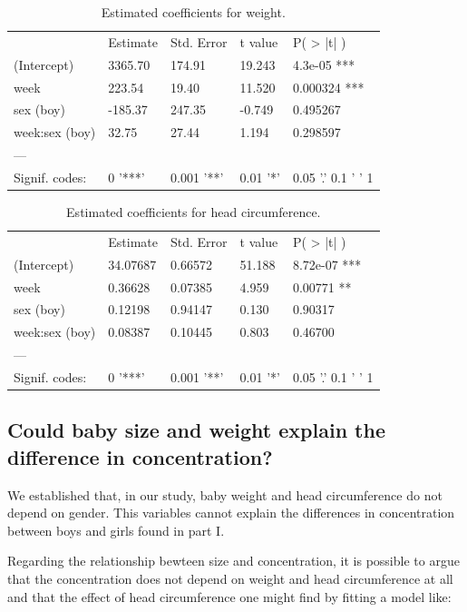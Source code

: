 \documentclass[12pt]{article}
\begin{document}
\begin{table}[!htb]
\begin{tabular}{lllll}
 & Estimate & Std. Error & t value & P\left( > |t| \right) \\
(Intercept) & 3365.70 & 174.91 & 19.243 & 4.3e-05 *** \\
week & 223.54 & 19.40 & 11.520 & 0.000324 *** \\
sex (boy) & -185.37 & 247.35 & -0.749 & 0.495267 \\
week:sex (boy) & 32.75 & 27.44 & 1.194 & 0.298597 \\
--- &  &  &  &  \\
Signif. codes: & 0 '***' & 0.001 '**' & 0.01 '*' & 0.05 '.' 0.1 ' ' 1
\end{tabular}
\caption{Estimated coefficients for weight.}
\label{tab:weight}
\end{table}

\begin{table}[!htb]
\begin{tabular}{lllll}
 & Estimate & Std. Error & t value & P\left( > |t| \right)\\
(Intercept) & 34.07687 & 0.66572 & 51.188 & 8.72e-07 *** \\
week & 0.36628 & 0.07385 & 4.959 & 0.00771 ** \\
sex (boy) & 0.12198 & 0.94147 & 0.130 & 0.90317 \\
week:sex (boy) & 0.08387 & 0.10445 & 0.803 & 0.46700 \\
--- &  &  &  &  \\
Signif. codes: & 0 '***' & 0.001 '**' & 0.01 '*' & 0.05 '.' 0.1 ' ' 1
\end{tabular}
\caption{Estimated coefficients for head circumference.}
\label{tab:head_c}
\end{table}

\clearpage

\subsection{Could baby size and weight explain the difference in concentration?}

We established that, in our study, baby weight and head circumference do not depend on gender. This variables cannot explain the differences in concentration between boys and girls found in part I.

Regarding the relationship bewteen size and concentration, it is possible to argue that the concentration does not depend on weight and head circumference at all and that the effect of head circumference one might find by fitting a model like:
\end{document}
